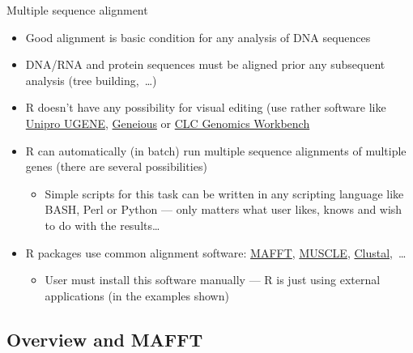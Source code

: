 \documentclass[compress, ucs, xelatex, 11pt, xcolor=svgnames, aspectratio=169,
	hyperref={
		bookmarks=true,
		unicode=true,
		colorlinks=true,
		pdftitle={Molecular data in R},
		plainpages=false,
		pdfauthor={Vojtech Zeisek},
		pdfsubject={Course about phylogeny and evolution in R},
		pdfcreator={XeLaTeX},
		pdfkeywords={R, evolution, phylogeny, molecular data},
		linkcolor=Crimson, %
		anchorcolor=Magenta, %
		citecolor=Magenta, %
		filecolor=Magenta, %
		menucolor=Magenta, %
		urlcolor=DodgerBlue, %
		pdftex},
	url={hyphens, lowtilde} %
	]{beamer}
\begin{document}
\begin{frame}{Multiple sequence alignment}
	\label{alignment}
	\begin{itemize}
		\item Good alignment is basic condition for any analysis of DNA sequences
		\item DNA/RNA and protein sequences must be aligned prior any subsequent analysis (tree building,~\ldots)
		\item R doesn't have any possibility for visual editing (use rather software like \href{http://ugene.net/}{Unipro UGENE}, \href{https://www.geneious.com/}{Geneious} or \href{https://digitalinsights.qiagen.com/products-overview/analysis-and-visualization/qiagen-clc-genomics-workbench/}{CLC Genomics Workbench}
		\item R can automatically (in batch) run multiple sequence alignments of multiple genes (there are several possibilities)
		\begin{itemize}
			\item Simple scripts for this task can be written in any scripting language like BASH, Perl or Python --- only matters what user likes, knows and wish to do with the results\ldots
		\end{itemize}
		\item R packages use common alignment software: \href{https://mafft.cbrc.jp/alignment/software/}{MAFFT}, \href{https://www.drive5.com/muscle/}{MUSCLE}, \href{http://clustal.org/}{Clustal},~\ldots
		\begin{itemize}
			\item User must install this software manually --- R is just using external applications (in the examples shown)
		\end{itemize}
	\end{itemize}
\end{frame}

\subsection{Overview and MAFFT}
\end{document}
